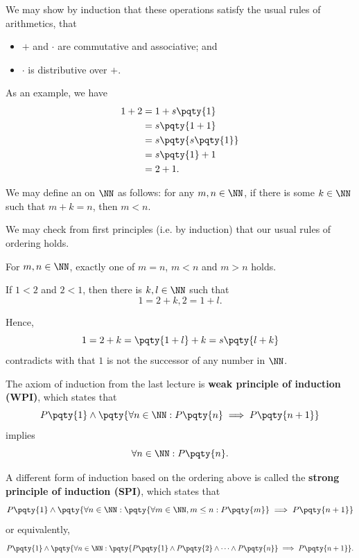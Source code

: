 We may show by induction that these operations satisfy the usual rules of arithmetics, that
\begin{itemize}
    \item \(+\) and \(\cdot\) are commutative and associative; and
    \item \(\cdot\) is distributive over \(+\).
\end{itemize}

\begin{example}[\(1 + 2 = 2 + 1\)]
    As an example, we have
    \begin{align*}
        1 + 2 &= 1 + s\pqty{1} \\
        &= s\pqty{1 + 1} \\
        &= s\pqty{s\pqty{1}} \\
        &= s\pqty{1} + 1 \\
        &= 2 + 1.
    \end{align*}
\end{example}

\begin{definition}[Ordering on \(\NN\)]
    We may define an  on \(\NN\) as follows: for any \(m, n \in \NN\), if there is some \(k \in \NN\) such that \(m + k = n\), then \(m < n\).
\end{definition}

We may check from first principles (i.e. by induction) that our usual rules of ordering holds.

\begin{proposition}
    For \(m, n \in \NN\), exactly one of \(m = n\), \(m < n\) and \(m > n\) holds.
\end{proposition}

\begin{example}
    If \(1 < 2\) and \(2 < 1\), then there is \(k, l \in \NN\) such that
    \[
        1 = 2 + k, 2 = 1 + l.
    \]

    Hence,
    \[
        1 = 2 + k = \pqty{1 + l} + k = s\pqty{l + k}
    \]
    contradicts with that \(1\) is not the successor of any number in \(\NN\).
\end{example}

The axiom of induction from the last lecture is \textbf{weak principle of induction (WPI)}, which states that
\[
    P\pqty{1} \land \pqty{\forall n \in \NN: P\pqty{n} \implies P\pqty{n + 1}}
\]
implies
\[
    \forall n \in \NN: P\pqty{n}.
\]

A different form of induction based on the ordering above is called the \textbf{strong principle of induction (SPI)}, which states that
\[
    P\pqty{1} \land \pqty{\forall n \in \NN: \pqty{\forall m \in \NN, m \leq n: P\pqty{m}} \implies P\pqty{n + 1}}
\]
or equivalently,
\[
    P\pqty{1} \land \pqty{\forall n \in \NN: \pqty{P\pqty{1} \land P\pqty{2} \land \cdots \land P\pqty{n}} \implies P\pqty{n + 1}}.
\]


